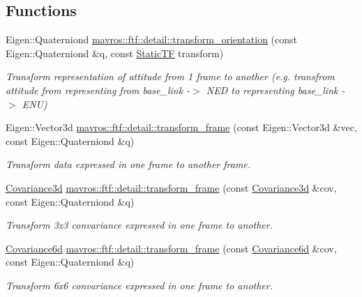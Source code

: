 \subsection*{Functions}
\begin{DoxyCompactItemize}
\item 
Eigen\+::\+Quaterniond \mbox{\hyperlink{group__nodelib_gaf97e6d622ff4f400e54ebcdae75407ef}{mavros\+::ftf\+::detail\+::transform\+\_\+orientation}} (const Eigen\+::\+Quaterniond \&q, const \mbox{\hyperlink{group__nodelib_gacff0983128574bbbe115917b13e57a63}{Static\+TF}} transform)
\begin{DoxyCompactList}\small\item\em Transform representation of attitude from 1 frame to another (e.\+g. transfrom attitude from representing from base\+\_\+link -\/$>$ N\+ED to representing base\+\_\+link -\/$>$ E\+NU) \end{DoxyCompactList}\item 
Eigen\+::\+Vector3d \mbox{\hyperlink{group__nodelib_ga30dfcfe08b7c490b12664624277d2fe6}{mavros\+::ftf\+::detail\+::transform\+\_\+frame}} (const Eigen\+::\+Vector3d \&vec, const Eigen\+::\+Quaterniond \&q)
\begin{DoxyCompactList}\small\item\em Transform data expressed in one frame to another frame. \end{DoxyCompactList}\item 
\mbox{\hyperlink{group__nodelib_ga56776cc8f5410a6bfeafa085fcd6fe30}{Covariance3d}} \mbox{\hyperlink{group__nodelib_ga767c8e2dd868f4d8bbd78c38662a17bb}{mavros\+::ftf\+::detail\+::transform\+\_\+frame}} (const \mbox{\hyperlink{group__nodelib_ga56776cc8f5410a6bfeafa085fcd6fe30}{Covariance3d}} \&cov, const Eigen\+::\+Quaterniond \&q)
\begin{DoxyCompactList}\small\item\em Transform 3x3 convariance expressed in one frame to another. \end{DoxyCompactList}\item 
\mbox{\hyperlink{group__nodelib_gadc24a922dd3f6a7ff0d7aed9bda42bca}{Covariance6d}} \mbox{\hyperlink{group__nodelib_ga266710bc46b4a6e376a609c4486d39cb}{mavros\+::ftf\+::detail\+::transform\+\_\+frame}} (const \mbox{\hyperlink{group__nodelib_gadc24a922dd3f6a7ff0d7aed9bda42bca}{Covariance6d}} \&cov, const Eigen\+::\+Quaterniond \&q)
\begin{DoxyCompactList}\small\item\em Transform 6x6 convariance expressed in one frame to another. \end{DoxyCompactList}\item 

\end{DoxyCompactItemize}
